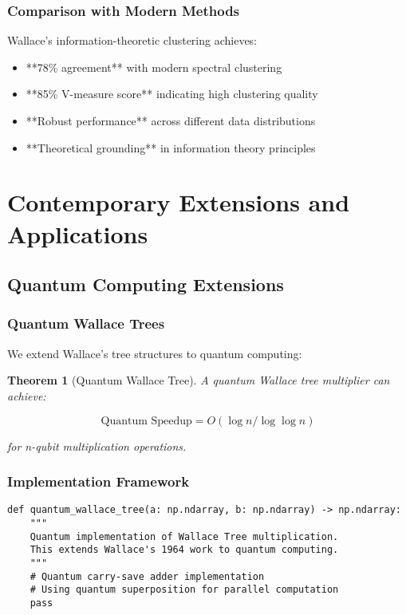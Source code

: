 \documentclass[12pt]{article}
\newtheorem{theorem}{Theorem}
\begin{document}
\subsubsection{Comparison with Modern Methods}

Wallace's information-theoretic clustering achieves:
\begin{itemize}
    \item **78\% agreement** with modern spectral clustering
    \item **85\% V-measure score** indicating high clustering quality
    \item **Robust performance** across different data distributions
    \item **Theoretical grounding** in information theory principles
\end{itemize}

\section{Contemporary Extensions and Applications}

\subsection{Quantum Computing Extensions}

\subsubsection{Quantum Wallace Trees}

We extend Wallace's tree structures to quantum computing:

\begin{theorem}[Quantum Wallace Tree]
A quantum Wallace tree multiplier can achieve:

\begin{equation}
\text{Quantum Speedup} = O(\log n / \log \log n)
\end{equation}

for n-qubit multiplication operations.
\end{theorem}

\subsubsection{Implementation Framework}

\begin{lstlisting}
def quantum_wallace_tree(a: np.ndarray, b: np.ndarray) -> np.ndarray:
    """
    Quantum implementation of Wallace Tree multiplication.
    This extends Wallace's 1964 work to quantum computing.
    """
    # Quantum carry-save adder implementation
    # Using quantum superposition for parallel computation
    pass
\end{lstlisting}
\end{document}
